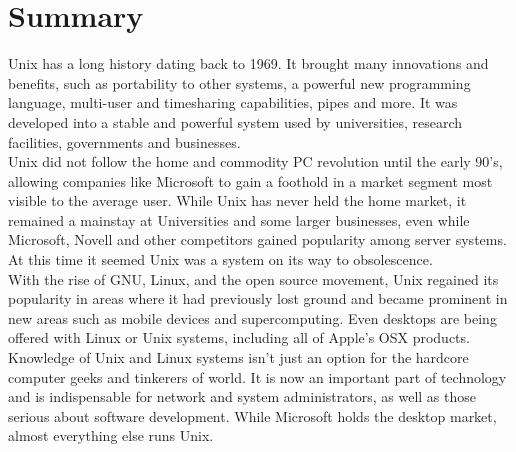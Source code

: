 \section*{Summary}

Unix has a long history dating back to 1969.  It brought many innovations and benefits, such as portability to other systems, a powerful new programming language, multi-user and timesharing capabilities, pipes and more.  It was developed into a stable and powerful system used by universities, research facilities, governments and businesses.\\

Unix did not follow the home and commodity PC revolution until the early 90's, allowing companies like Microsoft to gain a foothold in a market segment most visible to the average user.  While Unix has never held the home market, it remained a mainstay at Universities and some larger businesses, even while Microsoft, Novell and other competitors gained popularity among server systems.  At this time it seemed Unix was a system on its way to obsolescence.\\

With the rise of GNU, Linux, and the open source movement, Unix regained its popularity in areas where it had previously lost ground and became prominent in new areas such as mobile devices and supercomputing.  Even desktops are being offered with Linux or Unix systems, including all of Apple's OSX products.\\

Knowledge of Unix and Linux systems isn't just an option for the hardcore computer geeks and tinkerers of world.  It is now an important part of technology and is indispensable for network and system administrators, as well as those serious about software development.  While Microsoft holds the desktop market, almost everything else runs Unix.
